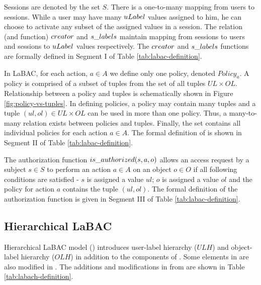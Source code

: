 	
Sessions are denoted by the set $S$. There is a one-to-many mapping from users to sessions. While a user  may have many $uLabel$ values assigned to him, he can choose to activate any subset of the assigned values in a session. The relation (and function) $creator$ and $s\_labels$ maintain mapping from sessions to users and sessions to $uLabel$ values respectively.  The $creator$ and $s\_labels$ functions are formally defined in Segment I of Table \ref{tab:labac-definition}. 

			

In LaBAC, for each action, $a \in A$ we define only one policy, denoted $Policy_a$. A policy is comprised of a subset of tuples from the set of all tuples $UL\times OL$. Relationship between a policy and tuples is schematically shown  in Figure \ref{fig:policy-vs-tuples}. In defining policies, a policy may contain many tuples and a tuple $(ul,ol) \in UL\times OL$ can be used in more than one policy. Thus, a many-to-many relation exists between policies and tuples. Finally, the set \textit{\Policy} contains all individual policies for each action $a \in A$. The formal definition of \textit{\Policy{}} is shown in Segment II of Table \ref{tab:labac-definition}.

The authorization function $is\_authorized(s, a, o)$ allows  an access request by a  subject $s \in S$ to perform an action $a \in A$ on an object $o \in O$ if all following conditions are satisfied - $s$ is assigned a value $ul$;  $o$ is assigned a value $ol$ and the policy for action $a$ contains the tuple $(ul,ol)$. The formal definition of the authorization function is given in Segment III of Table \ref{tab:labac-definition}.


	
		

		
	
	
	\subsection{Hierarchical LaBAC}
	Hierarchical LaBAC model (\hlabac ) introduces user-label hierarchy ($ULH$) and object-label hierarchy ($OLH$) in addition to the components of \clabac{}. Some elements in \clabac{} are also modified in \hlabac{}. The additions and modifications in \hlabac{} from \clabac{} are shown in Table \ref{tab:labach-definition}.
	
